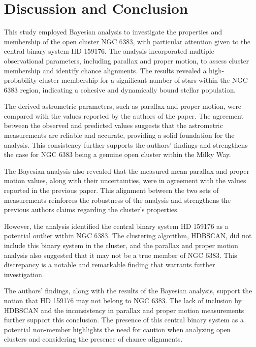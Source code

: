 \documentclass[fleqn,usenatbib,usedcolumn,useAMS]{mnras}
\begin{document}
\section{Discussion and Conclusion}\label{discussion}

This study employed Bayesian analysis to investigate the properties and membership of the open cluster NGC 6383, with particular attention given to the central binary system HD 159176. The analysis incorporated multiple observational parameters, including parallax and proper motion, to assess cluster membership and identify chance alignments. The results revealed a high-probability cluster membership for a significant number of stars within the NGC 6383 region, indicating a cohesive and dynamically bound stellar population.

The derived astrometric parameters, such as parallax and proper motion, were compared with the values reported by the authors of the paper. The agreement between the observed and predicted values suggests that the astrometric measurements are reliable and accurate, providing a solid foundation for the analysis. This consistency further supports the authors' findings and strengthens the case for NGC 6383 being a genuine open cluster within the Milky Way.

The Bayesian analysis also revealed that the measured mean parallax and proper motion values, along with their uncertainties, were in agreement with the values reported in the previous paper. This alignment between the two sets of measurements reinforces the robustness of the analysis and strengthens the previous authors claims regarding the cluster's properties.

However, the analysis identified the central binary system HD 159176 as a potential outlier within NGC 6383. The clustering algorithm, HDBSCAN, did not include this binary system in the cluster, and the parallax and proper motion analysis also suggested that it may not be a true member of NGC 6383. This discrepancy is a notable and remarkable finding that warrants further investigation.

The authors' findings, along with the results of the Bayesian analysis, support the notion that HD 159176 may not belong to NGC 6383. The lack of inclusion by HDBSCAN and the inconsistency in parallax and proper motion measurements further support this conclusion. The presence of this central binary system as a potential non-member highlights the need for caution when analyzing open clusters and considering the presence of chance alignments.
\end{document}
